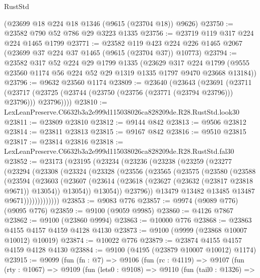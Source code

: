 \begin{lexlean}{RustStd}
\begin{coremodule}
    (@23699 @18 @224 @18 @1346 (@9615 (@23704 @18)) @9626)
@23750 := @23582 @790 @52 @786 @29 @3223 @1335
@23756 := @23719 @119 @317 @224 @224 @1465 @1799
@23771 := @23582
    @119
    @423
    @224
    @226
    @1465
    @2067
    (@23699 @37 @224 @37 @1465 (@9615 (@23704 @37)) @10773)
@23794 := @23582
    @317
    @52
    @224
    @29
    @1799
    @1335
    (@23629
      @317
      @224
      @1799
      (@9555 @23560 @1174 @56 @224 @52 @29 @1319 @1335 @1797 @9470 @23668 @13184))
@23796 := @9632 @23560 @1174
@23809 := @23640
    (@23643
      (@23691
        (@23711
          (@23717 (@23725 (@23744 (@23750 (@23756 (@23771 (@23794 @23796))) @23796))) @23796))))
@23810 := LexLeanPreserve.C6632b3a2e999d115038026ca828209de.R28.RustStd.look30
@23811 := @23809 @23810
@23812 := @9144 @842
@23813 := @9506 @23812
@23814 := @23811 @23813
@23815 := @9167 @842
@23816 := @9510 @23815
@23817 := @23814 @23816
@23818 := LexLeanPreserve.C6632b3a2e999d115038026ca828209de.R28.RustStd.fal30
@23852 := @23173
    (@23195
      (@23234
        (@23236
          (@23238
            (@23259
              (@23277
                (@23294
                  (@23308
                    (@23324
                      (@23328
                        (@23556
                          (@23565
                            (@23575
                              (@23580
                                (@23588
                                  (@23594
                                    (@23603
                                      (@23607
                                        (@23614
                                          (@23618 (@23627 (@23632 (@23817 @23818 @9671)) @13054))
                                          @13054))
                                      @13054))
                                  @23796))
                              @13479
                              @13482
                              @13485
                              @13487
                              @9671)))))))))))))
@23853 := @9083 @776
@23857 := @9974 (@9089 @776) (@9095 @776)
@23859 := @9100 (@9059 @9985)
@23860 := @4126 @7867
@23862 := @9100 (@23860 @9994)
@23863 := @10000 @776
@23868 := @23863 @4155 @4157 @4159 @4128 @4130
@23873 := @9100 (@9999 (@23868 @10007 @10012) @10019)
@23874 := @10022 @776
@23879 := @23874 @4155 @4157 @4159 @4128 @4130
@23884 := @9100 (@4195 (@23879 @10007 @10012) @1174)
@23915 := @9099
    (fun (fn : @7) =>
    @9106
      (fun (rc : @4119) =>
      @9107
        (fun (rty : @1067) =>
        @9109
          (fun (lets0 : @9108) =>
          @9110
            (fun (tail0 : @1326) =>

\end{coremodule}
\end{lexlean}
